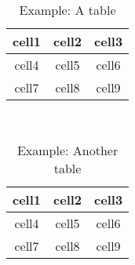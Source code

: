 \begin{minipage}{0.48\textwidth}
    \begin{table}
    	\centering

		\begin{tabular}{ |c|c|c| } 
		 \toprule
		 cell1 & cell2 & cell3 \\ 
		 \midrule
		 cell4 & cell5 & cell6 \\ 
		 cell7 & cell8 & cell9 \\ 
		 \bottomrule
		\end{tabular}

    \caption{Example: A table}
    \label{tab:example}
    \end{table}
\end{minipage}
~
\begin{minipage}{0.48\textwidth}
	\centering
	\begin{table}
		\begin{tabular}{ ccc } 
		 \toprule
		 cell1 & cell2 & cell3 \\ 
		 \midrule
		 cell4 & cell5 & cell6 \\ 
		 cell7 & cell8 & cell9 \\ 
		 \bottomrule
		\end{tabular}
		\caption{Example: Another table}
	\end{table}
\end{minipage}

